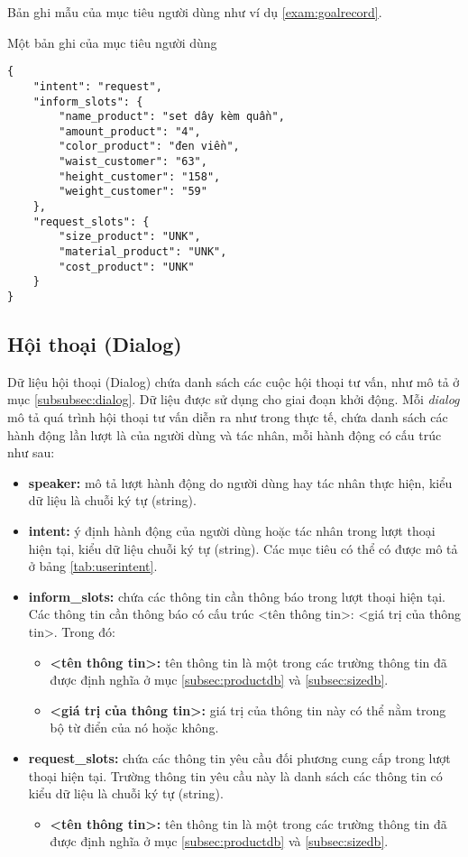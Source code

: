 Bản ghi mẫu của mục tiêu người dùng như ví dụ \ref{exam:goalrecord}.

\renewcommand{\textboxenvname}{Ví dụ}
\begin{textbox}{Một bản ghi của mục tiêu người dùng}
\begin{Verbatim}[breaklines=true, breakanywhere=true]
{
    "intent": "request",
    "inform_slots": {
        "name_product": "set dây kèm quần",
        "amount_product": "4",
        "color_product": "đen viền",
        "waist_customer": "63",
        "height_customer": "158",
        "weight_customer": "59"
    },
    "request_slots": {
        "size_product": "UNK",
        "material_product": "UNK",
        "cost_product": "UNK"
    }
}
\end{Verbatim}
\end{textbox}

\subsection{Hội thoại (Dialog)}
Dữ liệu hội thoại (Dialog) chứa danh sách các cuộc hội thoại tư vấn,
như mô tả ở mục \ref{subsubsec:dialog}. Dữ liệu được sử dụng cho
giai đoạn khởi động. Mỗi \textit{dialog} mô tả quá trình hội thoại
tư vấn diễn ra như trong thực tế, chứa danh sách các hành động lần lượt
là của người dùng và tác nhân, mỗi hành động có cấu trúc như sau:

\begin{itemize}
    \item \textbf{speaker:} mô tả lượt hành động do người dùng hay
    tác nhân thực hiện, kiểu dữ liệu là chuỗi ký tự (string).
    \item \textbf{intent:} ý định hành động của người dùng hoặc tác nhân
    trong lượt thoại hiện tại, kiểu dữ liệu chuỗi ký tự (string).
    Các mục tiêu có thể có được mô tả ở bảng \ref{tab:userintent}.
    \item \textbf{inform\_slots:} chứa các thông tin cần thông báo trong
    lượt thoại hiện tại. Các thông tin cần thông báo có cấu trúc
    <tên thông tin>: <giá trị của thông tin>. Trong đó:
    \begin{itemize}
        \item \textbf{<tên thông tin>:} tên thông tin là một trong các
        trường thông tin đã được định nghĩa ở mục \ref{subsec:productdb}
        và \ref{subsec:sizedb}.
        \item \textbf{<giá trị của thông tin>:} giá trị của thông tin
        này có thể nằm trong bộ từ điển của nó hoặc không.
    \end{itemize}
    \item \textbf{request\_slots:} chứa các thông tin yêu cầu đối phương
    cung cấp trong lượt thoại hiện tại. Trường thông tin yêu cầu này là
    danh sách các thông tin có kiểu dữ liệu là chuỗi ký tự (string).
    \begin{itemize}
        \item \textbf{<tên thông tin>:} tên thông tin là một trong các
        trường thông tin đã được định nghĩa ở mục \ref{subsec:productdb}
        và \ref{subsec:sizedb}.
    \end{itemize}
\end{itemize}

